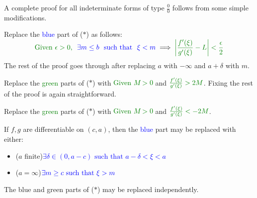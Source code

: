 A complete proof for all indeterminate forms of type $\frac 00$ follows from some simple modifications.
\begin{description}\itemsep1pt
	\item[\normalfont\emph{If $a=-\infty$}:] Replace the \textcolor{blue}{blue} part of ($\ast$) as follows:
	\[
		\textcolor{Green}{\text{Given $\epsilon>0$, }} \
		\textcolor{blue}{\exists m\le b\ \text{ such that }\ \xi<m}
		\implies \textcolor{Green}{\smash[t]{\nm{\frac{f'(\xi)}{g'(\xi)}-L}<\frac\epsilon 2}}
	\]
	The rest of the proof goes through after replacing $a$ with $-\infty$ and $a+\delta$ with $m$.
	
	\item[\normalfont\emph{If $L=\infty$}:] Replace the \textcolor{Green}{green} parts of ($\ast$) with \textcolor{Green}{Given $M>0$} and $\textcolor{Green}{\frac{f'(\xi)}{g'(\xi)}>2M}$. Fixing the rest of the proof is again straightforward.
	
	\item[\normalfont\emph{If $L=-\infty$}:] Replace the \textcolor{Green}{green} parts of ($\ast$) with \textcolor{Green}{Given $M>0$} and $\textcolor{Green}{\frac{f'(\xi)}{g'(\xi)}<-2M}$.
	
	\item[\normalfont\emph{Left-limits}:] If $f,g$ are differentiable on $(c,a)$, then the \textcolor{blue}{blue} part may be replaced with either:
	\begin{itemize}
	  \item ($a$ finite)\quad\textcolor{blue}{$\exists\delta\in(0,a-c)\text{ such that }a-\delta<\xi<a$}
	  \item ($a=\infty$)\quad $\textcolor{blue}{\exists m\ge c\text{ such that }\xi>m}$
	\end{itemize} 
\end{description}
The blue and green parts of ($\ast$) may be replaced independently. 


